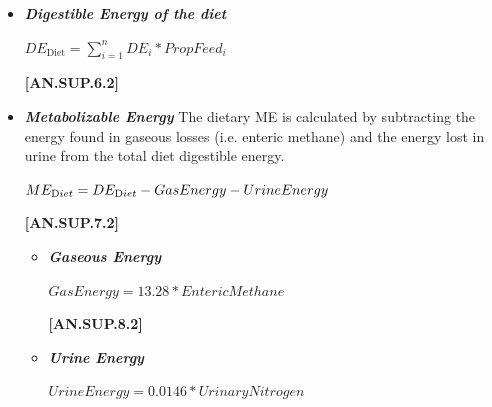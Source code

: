 \documentclass{article}
\begin{document}
\begin{refsection}
\begin{itemize}
    \item \textbf{\textit{Digestible Energy of the diet}} 
    \vspace{0.25cm}
    \begin{center}
    \(DE_{\text{Diet}} = \sum_{i=1}^{n} DE_{i} *PropFeed_{i} \)
    \end{center}
    \vspace{0.5cm}
    
            {\raggedleft \textbf{[AN.SUP.6.2]}\par}
            \vspace{0.5cm}

    \item \textbf{\textit{Metabolizable Energy}} 
    \vspace{0.25cm}
The dietary ME is calculated by subtracting the energy found in gaseous losses (i.e. enteric methane) and the energy lost in urine from the total diet digestible energy. 
\vspace{0.5cm}
            \begin{center}
            \(ME_{\text Diet} = DE_{\text Diet} - GasEnergy - UrineEnergy\)
            \end{center}
            \vspace{0.5cm}
    
            {\raggedleft \textbf{[AN.SUP.7.2]}\par}
            \vspace{0.5cm}
   
    \begin{itemize}
        \item \textbf{\textit{Gaseous Energy}}
            \vspace{0.25cm}
            \begin{center}
            \(GasEnergy = 13.28 * EntericMethane \)
            \end{center}
            \vspace{0.5cm}
    
            {\raggedleft \textbf{[AN.SUP.8.2]}\par}
            \vspace{0.5cm}
            \vspace{0.5cm}
        \item \textbf{\textit{Urine Energy}}
        \vspace{0.25cm}
            \begin{center}
            \(UrineEnergy = 0.0146* UrinaryNitrogen\)
            \end{center}
            \vspace{0.5cm}
    

\end{itemize}
\end{itemize}
\end{refsection}
\end{document}
